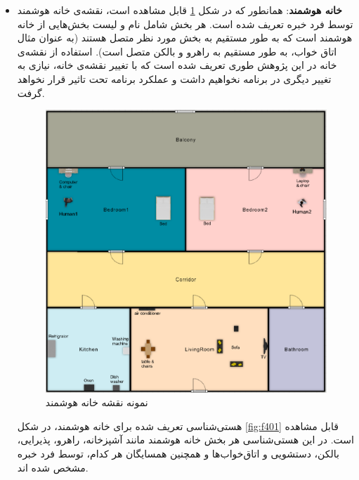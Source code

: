 \begin{itemize}
\item \textbf{خانه هوشمند}: همانطور که در شکل \ref{fig:f41} قابل مشاهده است، نقشه‌ی خانه هوشمند توسط فرد خبره تعریف شده است. هر بخش شامل نام و لیست بخش‌هایی از خانه هوشمند است که به طور مستقیم به بخش مورد نظر متصل هستند (به عنوان مثال اتاق خواب، به طور مستقیم به راهرو و بالکن متصل است). استفاده از نقشه‌ی خانه در این پژوهش طوری تعریف شده است که با تغییر نقشه‌ی خانه، نیازی به تغییر دیگری در برنامه نخواهیم داشت و عملکرد برنامه تحت تاثیر قرار نخواهد گرفت.

\begin{figure}[htp]
\centerline{\includegraphics[width=1\textwidth]{figs/f41.png}}
\caption{نمونه نقشه خانه هوشمند}
\label{fig:f41}
\end{figure}

 هستی‌شناسی تعریف شده برای خانه هوشمند، در شکل \ref{fig:f401} قابل مشاهده است. در این هستی‌شناسی هر بخش خانه هوشمند مانند آشپزخانه، راهرو، پذیرایی، بالکن، دستشویی و اتاق‌خواب‌ها و همچنین همسایگان هر کدام، توسط فرد خبره مشخص شده اند.


\end{itemize}
